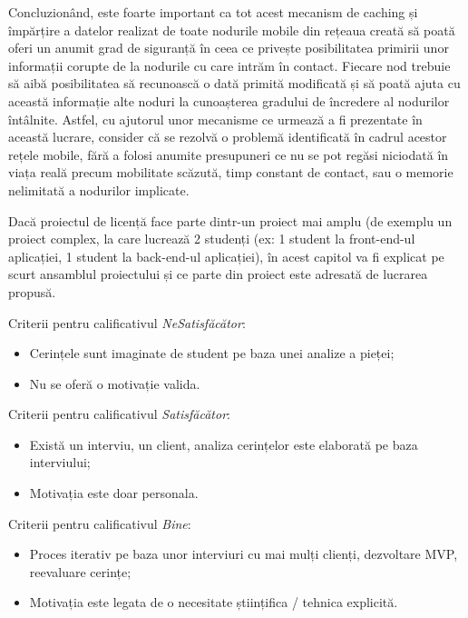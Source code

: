 \documentclass[12pt,a4paper]{report}
\newcommand{\worktype}[1]{[\textit{#1}] }
\newcommand{\dezvoltare}{\worktype{Dezvoltare de produs}}
\newcommand{\cercetare}{\worktype{Cercetare}}
\begin{document}
Concluzionând, este foarte important ca tot acest mecanism de caching și împărțire a datelor realizat de toate nodurile mobile din rețeaua creată să poată oferi un anumit grad de siguranță în ceea ce privește posibilitatea primirii unor informații corupte de la nodurile cu care intrăm în contact. Fiecare nod trebuie să aibă posibilitatea să recunoască o dată primită modificată și să poată ajuta cu această informație alte noduri la cunoașterea gradului de încredere al nodurilor întâlnite. Astfel, cu ajutorul unor mecanisme ce urmează a fi prezentate în această lucrare, consider că se rezolvă o problemă identificată în cadrul acestor rețele mobile, fără a folosi anumite presupuneri ce nu se pot regăsi niciodată în viața reală precum mobilitate scăzută, timp constant de contact, sau o memorie nelimitată a nodurilor implicate.

Dacă proiectul de licență face parte dintr-un proiect mai amplu (de exemplu un proiect complex, la care lucrează 2 studenți (ex: 1 student la front-end-ul aplicației, 1 student la back-end-ul aplicației), în acest capitol va fi explicat pe scurt ansamblul proiectului și ce parte din proiect este adresată de lucrarea propusă. 

Criterii pentru calificativul \textit{Ne\textit{Satisfăcător}}: 
\begin{itemize}
	\item \dezvoltare Cerințele sunt imaginate de student pe baza unei analize a pieței;
	\item \cercetare Nu se oferă o motivație valida.
\end{itemize}

Criterii pentru calificativul \textit{Satisfăcător}: 
\begin{itemize}
	\item \dezvoltare Există un interviu, un client, analiza cerințelor este elaborată pe baza interviului;
	\item \cercetare Motivația este doar personala.
\end{itemize}


Criterii pentru calificativul \textit{Bine}: 
\begin{itemize}
	\item	 \dezvoltare Proces iterativ pe baza unor interviuri cu mai mulți clienți, dezvoltare MVP, reevaluare cerințe;
	\item	 \cercetare Motivația este legata de o necesitate științifica / tehnica explicită.
\end{itemize}
\end{document}
